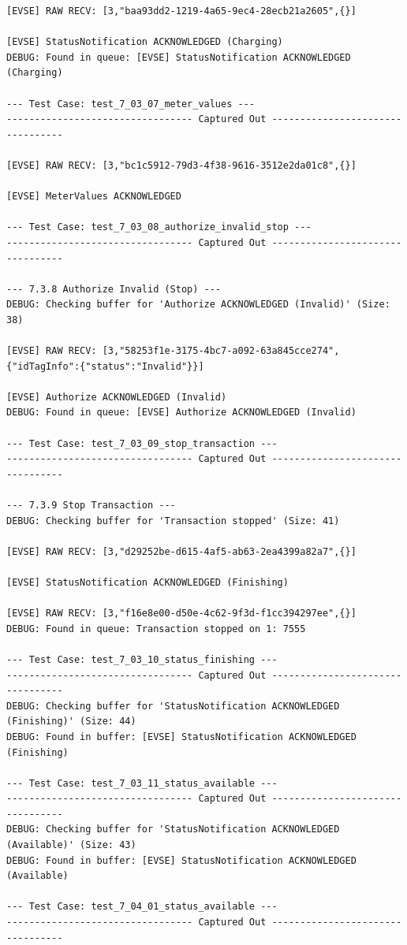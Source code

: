 \documentclass{article}
\begin{document}
\begin{lstlisting}
[EVSE] RAW RECV: [3,"baa93dd2-1219-4a65-9ec4-28ecb21a2605",{}]

[EVSE] StatusNotification ACKNOWLEDGED (Charging)
DEBUG: Found in queue: [EVSE] StatusNotification ACKNOWLEDGED (Charging)

--- Test Case: test_7_03_07_meter_values ---
--------------------------------- Captured Out ---------------------------------

[EVSE] RAW RECV: [3,"bc1c5912-79d3-4f38-9616-3512e2da01c8",{}]

[EVSE] MeterValues ACKNOWLEDGED

--- Test Case: test_7_03_08_authorize_invalid_stop ---
--------------------------------- Captured Out ---------------------------------

--- 7.3.8 Authorize Invalid (Stop) ---
DEBUG: Checking buffer for 'Authorize ACKNOWLEDGED (Invalid)' (Size: 38)

[EVSE] RAW RECV: [3,"58253f1e-3175-4bc7-a092-63a845cce274",{"idTagInfo":{"status":"Invalid"}}]

[EVSE] Authorize ACKNOWLEDGED (Invalid)
DEBUG: Found in queue: [EVSE] Authorize ACKNOWLEDGED (Invalid)

--- Test Case: test_7_03_09_stop_transaction ---
--------------------------------- Captured Out ---------------------------------

--- 7.3.9 Stop Transaction ---
DEBUG: Checking buffer for 'Transaction stopped' (Size: 41)

[EVSE] RAW RECV: [3,"d29252be-d615-4af5-ab63-2ea4399a82a7",{}]

[EVSE] StatusNotification ACKNOWLEDGED (Finishing)

[EVSE] RAW RECV: [3,"f16e8e00-d50e-4c62-9f3d-f1cc394297ee",{}]
DEBUG: Found in queue: Transaction stopped on 1: 7555

--- Test Case: test_7_03_10_status_finishing ---
--------------------------------- Captured Out ---------------------------------
DEBUG: Checking buffer for 'StatusNotification ACKNOWLEDGED (Finishing)' (Size: 44)
DEBUG: Found in buffer: [EVSE] StatusNotification ACKNOWLEDGED (Finishing)

--- Test Case: test_7_03_11_status_available ---
--------------------------------- Captured Out ---------------------------------
DEBUG: Checking buffer for 'StatusNotification ACKNOWLEDGED (Available)' (Size: 43)
DEBUG: Found in buffer: [EVSE] StatusNotification ACKNOWLEDGED (Available)

--- Test Case: test_7_04_01_status_available ---
--------------------------------- Captured Out ---------------------------------


\end{lstlisting}
\end{document}

